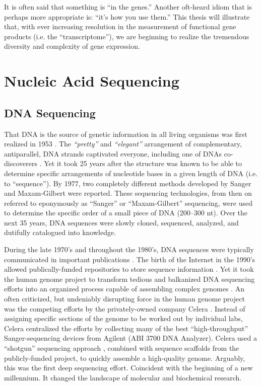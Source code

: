   It is often said that something is ``in the genes.'' Another oft-heard idiom that is perhaps more appropriate is: ``it's how you use them.'' This thesis will illustrate that, with ever increasing resolution in the measurement of functional gene products (i.e. the ``transcriptome''), we are beginning to realize the tremendous diversity and complexity of gene expression.

\section{Nucleic Acid Sequencing}
  \label{Intro:sec:Nucleic Acid Sequencing}

  \subsection{DNA Sequencing}
    \label{Intro:subsec:DNA Sequencing History}

    That DNA is the source of genetic information in all living organisms was first realized in 1953 \citep{Watson1953a}. The \textit{``pretty''} and \textit{``elegant''} arrangement of complementary, antiparallel, DNA strands captivated everyone, including one of DNAs co-discoverers \citep{Watson2012a}. Yet it took 25 years after the structure was known to be able to determine specific arrangements of nucleotide bases in a given length of DNA (i.e. to ``sequence''). By 1977, two completely different methods developed by Sanger \citep{Sanger1975a,Sanger1977b} and Maxam-Gilbert \citep{Maxam1977a} were reported. These sequencing technologies, from then on referred to eponymously as ``Sanger'' or ``Maxam-Gilbert'' sequencing, were used to determine the specific order of a small piece of DNA (200--300 nt). Over the next 35 years, DNA sequences were slowly cloned, sequenced, analyzed, and dutifully catalogued into knowledge.

    During the late 1970's and throughout the 1980's, DNA sequences were typically communicated in important publications \citep{Cordell1980a,Sanger1978a}. The birth of the Internet in the 1990's allowed publically-funded repositories to store sequence information \citep{Benson2011a}. Yet it took the human genome project to transform tedious and balkanized DNA sequencing efforts into an organized process capable of assembling complex genomes \citep{Lander2011a,Venter2001}. An often criticized, but undeniably disrupting force in the human genome project was the competing efforts by the privately-owned company Celera \citep{Venter2008a}. Instead of assigning specific sections of the genome to be worked out by individual labs, Celera centralized the efforts by collecting many of the best ``high-throughput'' Sanger-sequencing devices from Agilent (ABI 3700 DNA Analyzer). Celera used a ``shotgun'' sequencing approach \citep{Staden1979}, combined with sequence scaffolds from the publicly-funded project, to quickly assemble a high-quality genome. Arguably, this was the first deep sequencing effort. Coincident with the beginning of a new millennium. It changed the landscape of molecular and biochemical research.

